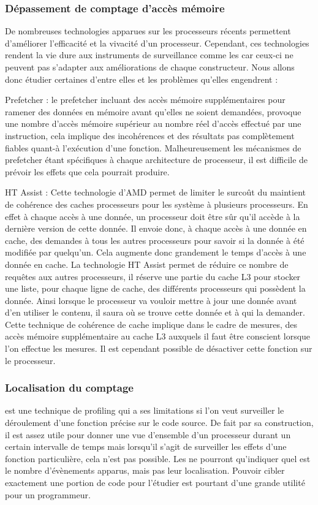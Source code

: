 					\subsubsection{Dépassement de comptage d'accès mémoire}
						De nombreuses technologies apparues sur les processeurs récents permettent d'améliorer l'efficacité et la vivacité d'un processeur. Cependant, ces technologies rendent la vie dure aux instruments de surveillance comme les \PMC car ceux-ci ne peuvent pas s'adapter aux améliorations de chaque constructeur. Nous allons donc étudier certaines d'entre elles et les problèmes qu'elles engendrent : 
						\bitem
							\item{Prefetcher : le prefetcher incluant des accès mémoire supplémentaires pour ramener des données en mémoire avant qu'elles ne soient demandées, provoque une nombre d'accès mémoire supérieur au nombre réel d'accès effectué par une instruction, cela implique des incohérences et des résultats pas complètement fiables quant-à l'exécution d'une fonction. Malheureusement les mécanismes de prefetcher étant spécifiques à chaque architecture de processeur, il est difficile de prévoir les effets que cela pourrait produire.}
							\item{HT Assist : Cette technologie d'AMD permet de limiter le surcoût du maintient de cohérence des caches processeurs pour les système à plusieurs processeurs. En effet à chaque accès à une donnée, un processeur doit être sûr qu'il accède à la dernière version de cette donnée. Il envoie donc, à chaque accès à une donnée en cache, des demandes à tous les autres processeurs pour savoir si la donnée à été modifiée par quelqu'un. Cela augmente donc grandement le temps d'accès à une donnée en cache. La technologie HT Assist permet de réduire ce nombre de requêtes aux autres processeurs, il réserve une partie du cache L3 pour stocker une liste, pour chaque ligne de cache, des différents processeurs qui possèdent la donnée. Ainsi lorsque le processeur va vouloir mettre à jour une donnée avant d'en utiliser le contenu, il saura où se trouve cette donnée et à qui la demander. Cette technique de cohérence de cache implique dans le cadre de mesures, des accès mémoire supplémentaire au cache L3 auxquels il faut être conscient lorsque l'on effectue les mesures. Il est cependant possible de désactiver cette fonction sur le processeur.} 
						\eitem
					\subsubsection{Localisation du comptage}
						\PMC est une technique de profiling qui a ses limitations si l'on veut surveiller le déroulement d'une fonction précise sur le code source. De fait par sa construction, il est assez utile pour donner une vue d'ensemble d'un processeur durant un certain intervalle de temps mais lorsqu'il s'agit de surveiller les effets d'une fonction particulière, cela n'est pas possible. Les \PMC ne pourront qu'indiquer quel est le nombre d'évènements apparus, mais pas leur localisation. Pouvoir cibler exactement une portion de code pour l'étudier est pourtant d'une grande utilité pour un programmeur.
